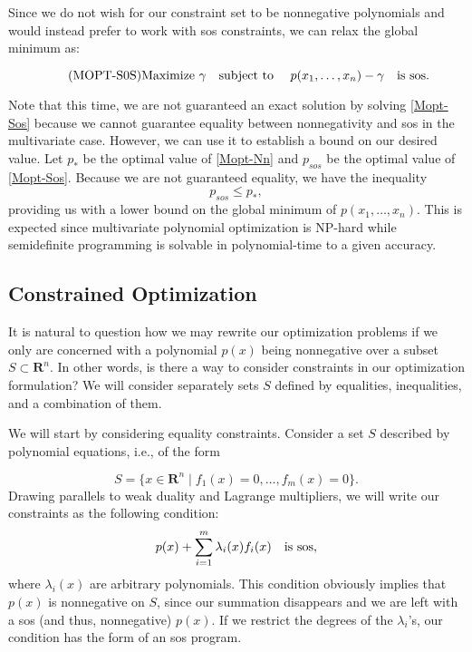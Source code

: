 	Since we do not wish for our constraint set to be nonnegative polynomials and would instead prefer to work with sos constraints, we can relax the global minimum as:
	
	\begin{equation} \label{Mopt-Sos} \tag{MOPT-S0S}
	\textnormal{Maximize } \gamma \quad \textnormal{subject to } \quad p(x_1, \dots, x_n) - \gamma \quad \textnormal{is sos}.
	\end{equation}
	
	Note that this time, we are not guaranteed an exact solution by solving \eqref{Mopt-Sos} because we cannot guarantee equality between nonnegativity and sos in the multivariate case. However, we can use it to establish a bound on our desired value. Let $p_*$ be the optimal value of \eqref{Mopt-Nn} and $p_{sos}$ be the optimal value of \eqref{Mopt-Sos}. Because we are not guaranteed equality, we have the inequality 
	$$
	p_{sos} \leq p_*,
	$$
	providing us with a lower bound on the global minimum of $p(x_1, \dots, x_n)$. This is expected since multivariate polynomial optimization is NP-hard while semidefinite programming is solvable in polynomial-time to a given accuracy. 
	
	\subsection{Constrained Optimization}

	It is natural to question how we may rewrite our optimization problems if we only are concerned with a polynomial $p(x)$ being nonnegative over a subset $S \subset \mathbf{R}^n$. In other words, is there a way to consider constraints in our optimization formulation? We will consider separately sets $S$ defined by equalities, inequalities, and a combination of them.
	
	We will start by considering equality constraints. Consider a set $S$ described by polynomial equations, i.e., of the form
	
	$$
	S = \{x \in \mathbf{R}^n \mid f_1(x) = 0, \dots, f_m(x) = 0\}.
	$$
	Drawing parallels to weak duality and Lagrange multipliers, we will write our constraints as the following condition:
	\begin{equation} \label{equal constraints}
		p(x) + \sum_{i=1}^{m} \lambda_i(x) f_i(x) \quad \textnormal{is sos},
	\end{equation}
	where $\lambda_i(x)$ are arbitrary polynomials. This condition obviously implies that $p(x)$ is nonnegative on $S$, since our summation disappears and we are left with a sos (and thus, nonnegative) $p(x)$. If we restrict the degrees of the $\lambda_i$'s, our condition has the form of an sos program.
	

